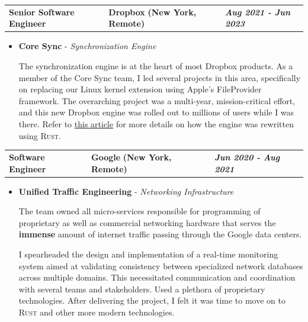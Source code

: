 \documentclass[a4paper,10pt]{article}
\newcommand*{\mahogany}{\textcolor{Mahogany}}
\newcommand{\jobtitle}[4]{
\vspace{0.3cm}
\begin{tabularx}
{\textwidth}
{ >{\raggedright\arraybackslash}p{6.5cm}
  >{\raggedright\arraybackslash}X
  >{\raggedleft\arraybackslash}p{4cm} }
\large\textbf{#1} &
\large\textbf{\mahogany{#2}} \normalsize\textbf{(#3)} &
\textit{\large\textbf{#4}}
\end{tabularx}
\vspace{-0.4cm}
}
\begin{document}
\jobtitle{Senior Software Engineer}{Dropbox}{New York, Remote}{Aug 2021 - Jun 2023}
\begin{itemize}[leftmargin=.27in,label=] \setlength\itemsep{-0.1cm}
	\item \textbf{Core Sync} - \textit{Synchronization Engine}

    The synchronization engine is at the heart of most Dropbox products. As a member of the Core Sync team, I led several projects in this area,
    specifically on replacing our Linux kernel extension using Apple's FileProvider framework.
    The overarching project was a multi-year, mission-critical effort,
    and this new Dropbox engine was rolled out to millions of users while I was there.
    Refer to \href{https://dropbox.tech/infrastructure/rewriting-the-heart-of-our-sync-engine}{this article}
    for more details on how the engine was rewritten using \textsc{Rust}.
\end{itemize}

\jobtitle{Software Engineer}{Google}{New York, Remote}{Jun 2020 - Aug 2021}
\begin{itemize}[leftmargin=.27in,label=] \setlength\itemsep{-0.1cm}
	\item \textbf{Unified Traffic Engineering} - \textit{Networking Infrastructure}

The team owned all micro-services responsible for programming of proprietary as well as commercial networking hardware that serves the \textbf{immense} amount of internet traffic passing through the Google data centers.

I spearheaded the design and implementation of a real-time monitoring system aimed at validating consistency between specialized network databases across multiple domains. This necessitated communication and coordination with several teams and stakeholders. Used a plethora of proprietary technologies. After delivering the project, I felt it was time to move on to \textsc{Rust} and other more modern technologies.
\end{itemize}
\end{document}
